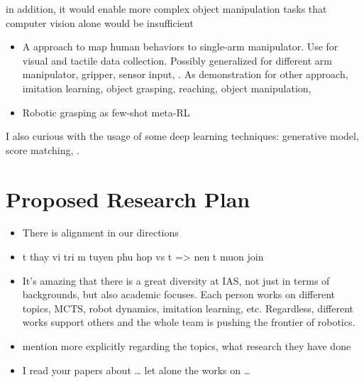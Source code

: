 in addition, it would enable more complex object manipulation tasks that computer vision alone would be insufficient

\begin{itemize}
	\item A approach to map human behaviors to single-arm manipulator. Use for visual and tactile data collection. Possibly generalized for different arm manipulator, gripper, sensor input, \etc. As demonstration for other approach, imitation learning, object grasping, reaching, object manipulation, \etc
	\item Robotic grasping as few-shot meta-\ac{RL}
\end{itemize}

I also curious with the usage of some deep learning techniques: generative model, score matching, \etc.

\section{Proposed Research Plan}

\todo{}

\begin{itemize}
	\item There is alignment in our directions
	\item t thay vi tri m tuyen phu hop vs t => nen t muon join
	\item It’s amazing that there is a great diversity at IAS, not just in terms of backgrounds, but also academic focuses. Each person works on different topics, MCTS, robot dynamics, imitation learning, etc. Regardless, different works support others and the whole team is pushing the frontier of robotics.
\end{itemize}

\begin{itemize}
	\item mention more explicitly regarding the topics, what research they have done
	\item I read your papers about … let alone the works on …
\end{itemize}
